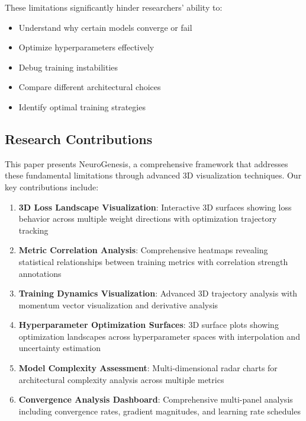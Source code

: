 \documentclass[12pt,a4paper]{article}
\begin{document}
These limitations significantly hinder researchers' ability to:
\begin{itemize}
    \item Understand why certain models converge or fail
    \item Optimize hyperparameters effectively
    \item Debug training instabilities
    \item Compare different architectural choices
    \item Identify optimal training strategies
\end{itemize}

\subsection{Research Contributions}

This paper presents NeuroGenesis, a comprehensive framework that addresses these fundamental limitations through advanced 3D visualization techniques. Our key contributions include:

\begin{enumerate}
    \item \textbf{3D Loss Landscape Visualization}: Interactive 3D surfaces showing loss behavior across multiple weight directions with optimization trajectory tracking

    \item \textbf{Metric Correlation Analysis}: Comprehensive heatmaps revealing statistical relationships between training metrics with correlation strength annotations

    \item \textbf{Training Dynamics Visualization}: Advanced 3D trajectory analysis with momentum vector visualization and derivative analysis

    \item \textbf{Hyperparameter Optimization Surfaces}: 3D surface plots showing optimization landscapes across hyperparameter spaces with interpolation and uncertainty estimation

    \item \textbf{Model Complexity Assessment}: Multi-dimensional radar charts for architectural complexity analysis across multiple metrics

    \item \textbf{Convergence Analysis Dashboard}: Comprehensive multi-panel analysis including convergence rates, gradient magnitudes, and learning rate schedules
\end{enumerate}
\end{document}
